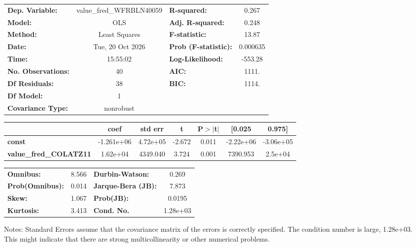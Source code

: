 \begin{center}
\begin{tabular}{lclc}
\toprule
\textbf{Dep. Variable:}        & value\_fred\_WFRBLN40059 & \textbf{  R-squared:         } &     0.267   \\
\textbf{Model:}                &           OLS            & \textbf{  Adj. R-squared:    } &     0.248   \\
\textbf{Method:}               &      Least Squares       & \textbf{  F-statistic:       } &     13.87   \\
\textbf{Date:}                 &     Tue, 20 Oct 2026     & \textbf{  Prob (F-statistic):} &  0.000635   \\
\textbf{Time:}                 &         15:55:02         & \textbf{  Log-Likelihood:    } &   -553.28   \\
\textbf{No. Observations:}     &              40          & \textbf{  AIC:               } &     1111.   \\
\textbf{Df Residuals:}         &              38          & \textbf{  BIC:               } &     1114.   \\
\textbf{Df Model:}             &               1          & \textbf{                     } &             \\
\textbf{Covariance Type:}      &        nonrobust         & \textbf{                     } &             \\
\bottomrule
\end{tabular}
\begin{tabular}{lcccccc}
                               & \textbf{coef} & \textbf{std err} & \textbf{t} & \textbf{P$> |$t$|$} & \textbf{[0.025} & \textbf{0.975]}  \\
\midrule
\textbf{const}                 &   -1.261e+06  &     4.72e+05     &    -2.672  &         0.011        &    -2.22e+06    &    -3.06e+05     \\
\textbf{value\_fred\_COLATZ11} &     1.62e+04  &     4349.040     &     3.724  &         0.001        &     7390.953    &      2.5e+04     \\
\bottomrule
\end{tabular}
\begin{tabular}{lclc}
\textbf{Omnibus:}       &  8.566 & \textbf{  Durbin-Watson:     } &    0.269  \\
\textbf{Prob(Omnibus):} &  0.014 & \textbf{  Jarque-Bera (JB):  } &    7.873  \\
\textbf{Skew:}          &  1.067 & \textbf{  Prob(JB):          } &   0.0195  \\
\textbf{Kurtosis:}      &  3.413 & \textbf{  Cond. No.          } & 1.28e+03  \\
\bottomrule
\end{tabular}
\end{center}

Notes: \newline
 [1] Standard Errors assume that the covariance matrix of the errors is correctly specified. \newline
 [2] The condition number is large, 1.28e+03. This might indicate that there are \newline
 strong multicollinearity or other numerical problems.